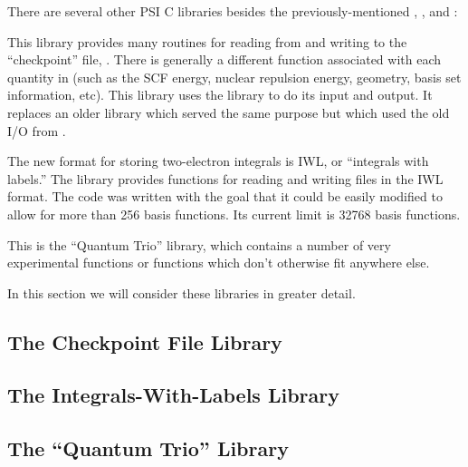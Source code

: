 %
%
%
%
There are several other PSI C libraries besides the previously-mentioned
, , and :
\begin{description}
\item{} This library provides many routines for reading 
from and writing to the ``checkpoint'' file, .  There is
generally a different function associated with each quantity in 
(such as the SCF energy, nuclear repulsion energy, geometry,
basis set information, etc).  This library uses the 
library to do its input and output.  It replaces an older library 
 which served the same purpose but which used the
old I/O from .
\item{} The new format for storing two-electron integrals is
IWL, or ``integrals with labels.''  The library  provides functions for
reading and writing files in the IWL format.  The code was written with 
the goal that it could be easily modified to allow for more than 256
basis functions. Its current limit is 32768 basis functions.
\item{} This is the ``Quantum Trio'' library, which contains a number
of very experimental functions or functions which don't otherwise
fit anywhere else.
\end{description}

In this section we will consider these libraries in greater detail.

\subsection{The Checkpoint File Library}\label{C_CHECKPOINT}


\subsection{The Integrals-With-Labels Library}\label{C_IWL}


\subsection{The ``Quantum Trio'' Library}\label{C_QT}

